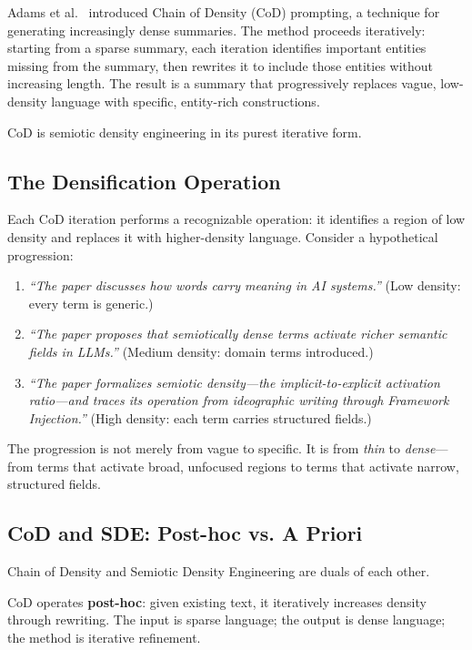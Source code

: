 \documentclass[12pt,a4paper]{article}
\begin{document}
Adams et al.\ \cite{adams2023} introduced Chain of Density (CoD) prompting, a technique for generating increasingly dense summaries.
The method proceeds iteratively: starting from a sparse summary, each iteration identifies important entities missing from the summary, then rewrites it to include those entities without increasing length.
The result is a summary that progressively replaces vague, low-density language with specific, entity-rich constructions.

CoD is semiotic density engineering in its purest iterative form.

\subsection{The Densification Operation}

Each CoD iteration performs a recognizable operation: it identifies a region of low density and replaces it with higher-density language.
Consider a hypothetical progression:

\begin{enumerate}
  \item \textit{``The paper discusses how words carry meaning in AI systems.''} (Low density: every term is generic.)
  \item \textit{``The paper proposes that semiotically dense terms activate richer semantic fields in LLMs.''} (Medium density: domain terms introduced.)
  \item \textit{``The paper formalizes semiotic density---the implicit-to-explicit activation ratio---and traces its operation from ideographic writing through Framework Injection.''} (High density: each term carries structured fields.)
\end{enumerate}

The progression is not merely from vague to specific.
It is from \textit{thin} to \textit{dense}---from terms that activate broad, unfocused regions to terms that activate narrow, structured fields.

\subsection{CoD and SDE: Post-hoc vs. A Priori}

Chain of Density and Semiotic Density Engineering are duals of each other.

CoD operates \textbf{post-hoc}: given existing text, it iteratively increases density through rewriting.
The input is sparse language; the output is dense language; the method is iterative refinement.
\end{document}
